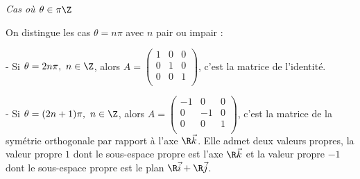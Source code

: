 {\begin{enumerate}
{{\it Cas où $\theta\in\pi\Z$ }

On distingue les cas $\theta=n\pi$ avec $n$ pair ou impair :

- Si $\theta=2n\pi,\ n\in\Z$, alors $\displaystyle A=\begin{pmatrix}1&0&0 \\  0&1&0 \\ 0&0&1 \\ \end{pmatrix}$, c'est la matrice de l'identité.

- Si $\theta=(2n+1)\pi,\ n\in\Z$, alors $\displaystyle A=\begin{pmatrix}-1&0&0 \\  0&-1&0 \\ 0&0&1 \\ \end{pmatrix}$, c'est la matrice de la symétrie orthogonale par rapport à l'axe $\R\vec k$. Elle admet deux valeurs propres, la valeur propre $1$ dont le sous-espace propre est l'axe $\R\vec k$ et la valeur propre $-1$ dont le sous-espace propre est le plan $\R\vec i+\R\vec j$.}
\end{enumerate}
}
